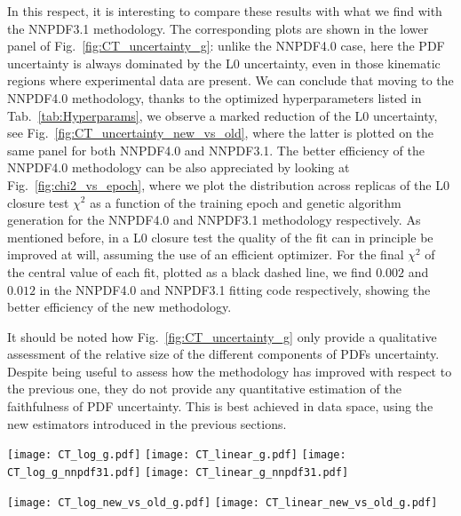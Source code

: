In this respect, it is interesting to compare these results with what we find
with the NNPDF3.1 methodology. The corresponding plots are shown in the lower panel of
Fig.~\ref{fig:CT_uncertainty_g}: unlike the NNPDF4.0 case, here the PDF
uncertainty is always dominated by the L0 uncertainty, even in those kinematic
regions where experimental data are present. We can conclude that moving to the
NNPDF4.0 methodology, thanks to the optimized hyperparameters listed in Tab.~\ref{tab:Hyperparams},
we observe a marked reduction of the L0 uncertainty, 
see Fig.~\ref{fig:CT_uncertainty_new_vs_old}, where the latter is plotted on the same panel
for both NNPDF4.0 and NNPDF3.1. 
The better efficiency of the NNPDF4.0 methodology can be also appreciated
by looking at Fig.~\ref{fig:chi2_vs_epoch}, where we plot the distribution
across replicas of the L0 closure test $\chi^2$
as a function of the training epoch and genetic algorithm generation
for the NNPDF4.0 and NNPDF3.1 methodology respectively. As mentioned before, in a L0
closure test the quality of the fit can in principle be improved at will,
assuming the use of an efficient optimizer. For the final $\chi^2$ of the
central value of each fit, plotted as a black dashed line, we find $0.002$ and
$0.012$ in the NNPDF4.0 and NNPDF3.1 fitting code respectively, showing the better
efficiency of the new methodology. 

It should be noted how
Fig.~\ref{fig:CT_uncertainty_g}  only
provide a qualitative assessment of the relative size of the different
components of PDFs uncertainty. Despite being useful to assess how the
methodology has improved with respect to the previous one, they do not provide
any quantitative estimation of the faithfulness of PDF uncertainty. This is best
achieved in data space, using the new estimators introduced in the previous
sections.

\begin{figure*}[h]
    \centering
    \texttt{[image: CT\_log\_g.pdf]}
    \texttt{[image: CT\_linear\_g.pdf]}
    \texttt{[image: CT\_log\_g\_nnpdf31.pdf]}
    \texttt{[image: CT\_linear\_g\_nnpdf31.pdf]}
    \caption{Relative PDF error for the gluon distribution in the NNPDF4.0 (upper panel)
    and NNPDF3.1 (lower panel) methodology, plotted in logarithmic (left) and linear scale (right).}
    \label{fig:CT_uncertainty_g}    
\end{figure*}

\begin{figure*}[h]
    \centering
    \texttt{[image: CT\_log\_new\_vs\_old\_g.pdf]}
    \texttt{[image: CT\_linear\_new\_vs\_old\_g.pdf]}
    \caption{Level 0 uncertainty in the NNPDF4.0 and NNPDF3.1 methodology.}
    \label{fig:CT_uncertainty_new_vs_old}    
\end{figure*}

